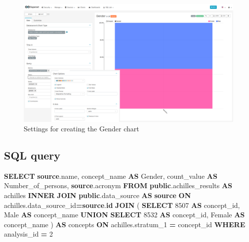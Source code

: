 \documentclass[
]{book}
\newenvironment{Shaded}{\begin{snugshade}}{\end{snugshade}}
\newcommand{\DecValTok}[1]{\textcolor[rgb]{0.00,0.00,0.81}{#1}}
\newcommand{\KeywordTok}[1]{\textcolor[rgb]{0.13,0.29,0.53}{\textbf{#1}}}
\newcommand{\NormalTok}[1]{#1}
\newcommand{\OperatorTok}[1]{\textcolor[rgb]{0.81,0.36,0.00}{\textbf{#1}}}
\newcommand{\StringTok}[1]{\textcolor[rgb]{0.31,0.60,0.02}{#1}}
\begin{document}
\begin{figure}
\includegraphics[width=1\linewidth]{images/04-person/05-gender} \caption{Settings for creating the Gender chart}\label{fig:gender}
\end{figure}

\hypertarget{sql-query-11}{%
\subsection{SQL query}\label{sql-query-11}}

\begin{Shaded}
\begin{Highlighting}[]
\KeywordTok{SELECT} \KeywordTok{source}\NormalTok{.name,}
\NormalTok{       concept\_name }\KeywordTok{AS}\NormalTok{ Gender, }
\NormalTok{       count\_value }\KeywordTok{AS}\NormalTok{ Number\_of\_persons,}
       \KeywordTok{source}\NormalTok{.acronym}
\KeywordTok{FROM} \KeywordTok{public}\NormalTok{.achilles\_results }\KeywordTok{AS}\NormalTok{ achilles}
\KeywordTok{INNER} \KeywordTok{JOIN} \KeywordTok{public}\NormalTok{.data\_source }\KeywordTok{AS} \KeywordTok{source} \KeywordTok{ON}\NormalTok{ achilles.data\_source\_id}\OperatorTok{=}\KeywordTok{source}\NormalTok{.}\KeywordTok{id}
\KeywordTok{JOIN}\NormalTok{ (}
  \KeywordTok{SELECT} \StringTok{\textquotesingle{}8507\textquotesingle{}} \KeywordTok{AS}\NormalTok{ concept\_id, }\StringTok{\textquotesingle{}Male\textquotesingle{}} \KeywordTok{AS}\NormalTok{ concept\_name}
  \KeywordTok{UNION}
  \KeywordTok{SELECT} \StringTok{\textquotesingle{}8532\textquotesingle{}} \KeywordTok{AS}\NormalTok{ concept\_id, }\StringTok{\textquotesingle{}Female\textquotesingle{}} \KeywordTok{AS}\NormalTok{ concept\_name}
\NormalTok{) }\KeywordTok{AS}\NormalTok{ concepts }\KeywordTok{ON}\NormalTok{ achilles.stratum\_1 }\OperatorTok{=}\NormalTok{ concept\_id}
\KeywordTok{WHERE}\NormalTok{ analysis\_id }\OperatorTok{=} \DecValTok{2}
\end{Highlighting}
\end{Shaded}
\end{document}
